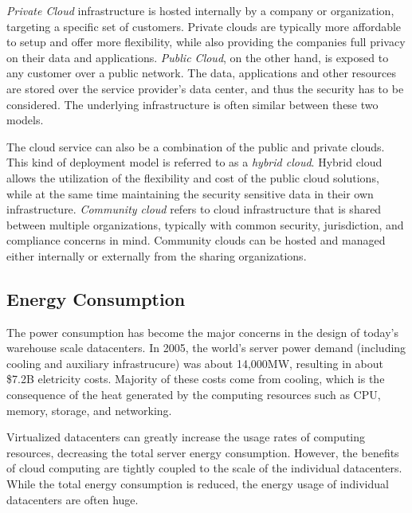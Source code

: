 \emph{Private Cloud} infrastructure is hosted internally by a company or organization, targeting a specific set of customers. Private clouds are typically more affordable to setup and offer more flexibility, while also providing the companies full privacy on their data and applications. \emph{Public Cloud}, on the other hand, is exposed to any customer over a public network. The data, applications and other resources are stored over the service provider's data center, and thus the security has to be considered. The underlying infrastructure is often similar between these two models.~\cite{Mell:2011:ccdef}

The cloud service can also be a combination of the public and private clouds. This kind of deployment model is referred to as a \emph{hybrid cloud}. Hybrid cloud allows the utilization of the flexibility and cost of the public cloud solutions, while at the same time maintaining the security sensitive data in their own infrastructure. \emph{Community cloud} refers to cloud infrastructure that is shared between multiple organizations, typically with common security, jurisdiction, and compliance concerns in mind. Community clouds can be hosted and managed either internally or externally from the sharing organizations.~\cite{Mell:2011:ccdef}

\subsection{Energy Consumption}
The power consumption has become the major concerns in the design of today's warehouse scale datacenters. In 2005, the world's server power demand (including cooling and auxiliary infrastrucure) was about 14,000MW, resulting in about \$7.2B eletricity costs. Majority of these costs come from cooling, which is the consequence of the heat generated by the computing resources such as CPU, memory, storage, and networking.~\cite{Koomey:2007:PC, Fan:2007:PPW}

Virtualized datacenters can greatly increase the usage rates of computing resources, decreasing the total server energy consumption. However, the benefits of cloud computing are tightly coupled to the scale of the individual datacenters. While the total energy consumption is reduced, the energy usage of individual datacenters are often huge.~\cite{Hoelzle:2009:DCI}

